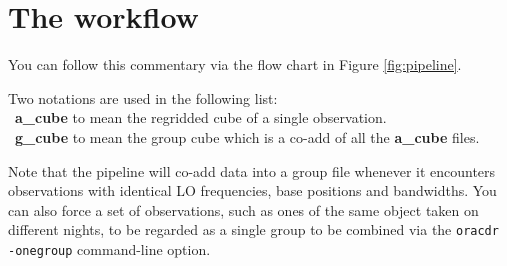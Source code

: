 \documentclass[11pt,oneside,chapters]{starlink}
\begin{document}
\newpage
\section{The workflow}
You can follow this commentary via the flow chart in Figure \ref{fig:pipeline}.

Two notations are used in the following list:\\
\textbullet\ \textbf{a\_cube} to mean the regridded cube of a single
observation. \\
\textbullet\ \textbf{g\_cube} to mean the group cube which is a co-add
of all the \textbf{a\_cube} files.

Note that the pipeline will co-add data into a group file whenever it
encounters observations with identical LO frequencies, base positions
and bandwidths.  You can also force a set of observations, such as
ones of the same object taken on different nights, to be regarded as
a single group to be combined via the \texttt{oracdr -onegroup}
command-line option.
\end{document}
